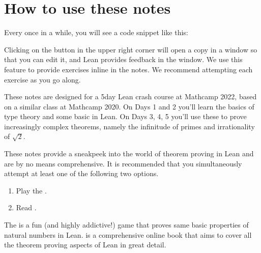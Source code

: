 \documentclass[letterpaper,10pt,english]{sphinxmanual}
\begin{document}
\section{How to use these notes}
\label{\detokenize{introduction:how-to-use-these-notes}}
\sphinxAtStartPar
Every once in a while, you will see a code snippet like this:

\def\sphinxLiteralBlockLabel{\label{\detokenize{introduction:hello-world}}}
\begin{sphinxVerbatim}[commandchars=\\\{\}]
   
\end{sphinxVerbatim}

\sphinxAtStartPar
Clicking on the  button in the upper right corner will
open a copy in a window
so that you can edit it,
and Lean provides feedback in the  window.
We use this feature to provide exercises inline in the notes.
We recommend attempting each exercise as you go along.

\sphinxAtStartPar
These notes are designed for a 5\sphinxhyphen{}day Lean crash course at Mathcamp 2022, based on a similar class at Mathcamp 2020.
On Days 1 and 2 you’ll learn the basics of type theory and some basic  in Lean.
On Days 3, 4, 5 you’ll use these to prove increasingly complex theorems, namely the infinitude of primes and irrationality of \(\sqrt{2}\).

\sphinxAtStartPar
These notes provide a sneak\sphinxhyphen{}peek into the world of theorem proving in Lean and are by no means comprehensive.
It is recommended that you simultaneously attempt at least one of the following two options.
\begin{enumerate}
%
\item {} 
\sphinxAtStartPar
Play the .

\item {} 
\sphinxAtStartPar
Read .

\end{enumerate}

\sphinxAtStartPar
The  is a fun (and highly addictive!) game that proves same basic properties of natural numbers in Lean.
 is a comprehensive online book that aims to cover all the theorem proving aspects of Lean in great detail.
\end{document}
